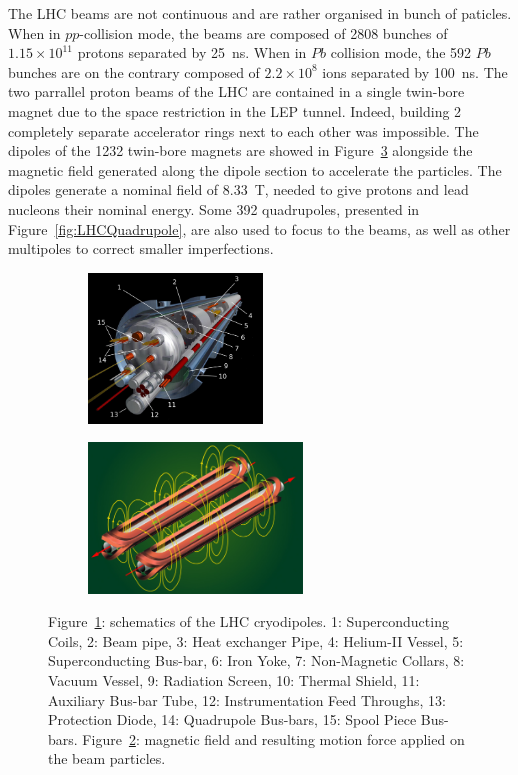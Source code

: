 	The LHC beams are not continuous and are rather organised in bunch of paticles. When in $pp$-collision mode, the beams are composed of 2808 bunches of $1.15 \times 10^{11}$ protons separated by \SI{25}{ns}. When in $Pb$ collision mode, the 592 $Pb$ bunches are on the contrary composed of $2.2 \times 10^8$ ions separated by \SI{100}{ns}. The two parrallel proton beams of the LHC are contained in a single twin-bore magnet due to the space restriction in the LEP tunnel. Indeed, building 2 completely separate accelerator rings next to each other was impossible. The dipoles of the 1232 twin-bore magnets are showed in Figure~\ref{fig:LHCDipole} alongside the magnetic field generated along the dipole section to accelerate the particles. The dipoles generate a nominal field of \SI{8.33}{T}, needed to give protons and lead nucleons their nominal energy. Some 392 quadrupoles, presented in Figure~\ref{fig:LHCQuadrupole}, are also used to focus to the beams, as well as other multipoles to correct smaller imperfections.
	
	\begin{figure}[H]
		\begin{subfigure}{0.5\linewidth}
			\centering
			\includegraphics[height = 4cm]{fig/chapt2/LHC-dipole.png}
			\caption{\label{fig:LHCDipole:A}}
		\end{subfigure}
		\begin{subfigure}{0.5\linewidth}
			\centering
			\includegraphics[height = 4cm]{fig/chapt2/LHC-dipole-field.jpg}
			\caption{\label{fig:LHCDipole:B}}
		\end{subfigure}
		\caption{\label{fig:LHCDipole} Figure~\ref{fig:LHCDipole:A}: schematics of the LHC cryodipoles. 1: Superconducting Coils, 2: Beam pipe, 3: Heat exchanger Pipe, 4: Helium-II Vessel, 5: Superconducting Bus-bar, 6: Iron Yoke, 7: Non-Magnetic Collars, 8: Vacuum Vessel, 9: Radiation Screen, 10: Thermal Shield, 11: Auxiliary Bus-bar Tube, 12: Instrumentation Feed Throughs, 13: Protection Diode, 14: Quadrupole Bus-bars, 15: Spool Piece Bus-bars. Figure~\ref{fig:LHCDipole:B}: magnetic field and resulting motion force applied on the beam particles.}
	\end{figure}
	
